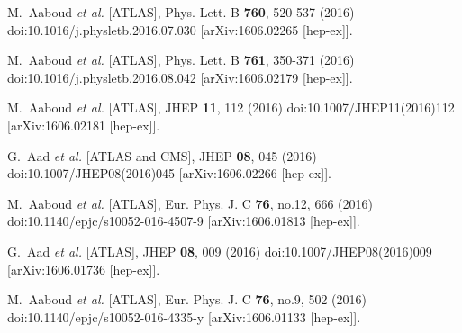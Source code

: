 \begin{thebibliography}{9}
M.~Aaboud \textit{et al.} [ATLAS],
Phys. Lett. B \textbf{760}, 520-537 (2016)
doi:10.1016/j.physletb.2016.07.030
[arXiv:1606.02265 [hep-ex]].

M.~Aaboud \textit{et al.} [ATLAS],
Phys. Lett. B \textbf{761}, 350-371 (2016)
doi:10.1016/j.physletb.2016.08.042
[arXiv:1606.02179 [hep-ex]].

M.~Aaboud \textit{et al.} [ATLAS],
JHEP \textbf{11}, 112 (2016)
doi:10.1007/JHEP11(2016)112
[arXiv:1606.02181 [hep-ex]].

G.~Aad \textit{et al.} [ATLAS and CMS],
JHEP \textbf{08}, 045 (2016)
doi:10.1007/JHEP08(2016)045
[arXiv:1606.02266 [hep-ex]].

M.~Aaboud \textit{et al.} [ATLAS],
Eur. Phys. J. C \textbf{76}, no.12, 666 (2016)
doi:10.1140/epjc/s10052-016-4507-9
[arXiv:1606.01813 [hep-ex]].

G.~Aad \textit{et al.} [ATLAS],
JHEP \textbf{08}, 009 (2016)
doi:10.1007/JHEP08(2016)009
[arXiv:1606.01736 [hep-ex]].

M.~Aaboud \textit{et al.} [ATLAS],
Eur. Phys. J. C \textbf{76}, no.9, 502 (2016)
doi:10.1140/epjc/s10052-016-4335-y
[arXiv:1606.01133 [hep-ex]].


\end{thebibliography}
